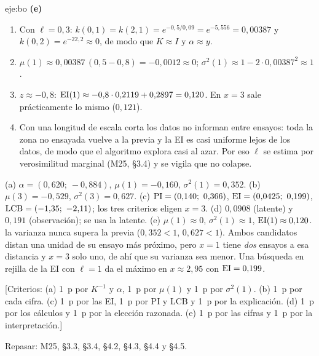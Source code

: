 \begin{solucion}{eje:bo}
\noindent\textbf{(e)}
\begin{enumerate}[label=\arabic*.]
  \item Con $\ell=0{,}3$: $k(0,1)=k(2,1)=e^{-0{,}5/0{,}09}=e^{-5{,}556}=0{,}00387$ y $k(0,2)=e^{-22{,}2}\approx 0$, de modo que $K\approx I$ y $\alpha\approx y$.
  \item $\mu(1)\approx 0{,}00387\,(0{,}5-0{,}8)=-0{,}0012\approx 0$; $\sigma^{2}(1)\approx 1-2\cdot 0{,}00387^{2}\approx 1$.
  \item $z\approx-0{,}8$: $\mathrm{EI}(1)\approx-0{,}8\cdot 0{,}2119+0{,}2897=0{,}120$. En $x=3$ sale prácticamente lo mismo ($0{,}121$).
  \item Con una longitud de escala corta los datos no informan entre ensayos: toda la zona no ensayada vuelve a la previa y la EI es casi uniforme lejos de los datos, de modo que el algoritmo explora casi al azar. Por eso $\ell$ se estima por verosimilitud marginal (M25, §3.4) y se vigila que no colapse.
\end{enumerate}
\resultado (a) $\alpha=(0{,}620;\ -0{,}884)$, $\mu(1)=-0{,}160$, $\sigma^{2}(1)=0{,}352$. (b) $\mu(3)=-0{,}529$, $\sigma^{2}(3)=0{,}627$. (c) $\mathrm{PI}=(0{,}140;\ 0{,}366)$, $\mathrm{EI}=(0{,}0425;\ 0{,}199)$, $\mathrm{LCB}=(-1{,}35;\ -2{,}11)$; los tres criterios eligen $x=3$. (d) $0{,}0908$ (latente) y $0{,}191$ (observación); se usa la latente. (e) $\mu(1)\approx 0$, $\sigma^{2}(1)\approx 1$, $\mathrm{EI}(1)\approx 0{,}120$.
\comprobacion la varianza nunca supera la previa ($0{,}352<1$, $0{,}627<1$). Ambos candidatos distan una unidad de su ensayo más próximo, pero $x=1$ tiene \emph{dos} ensayos a esa distancia y $x=3$ solo uno, de ahí que su varianza sea menor. Una búsqueda en rejilla de la EI con $\ell=1$ da el máximo en $x\approx 2{,}95$ con $\mathrm{EI}=0{,}199$.

[Criterios: (a) 1~p por $K^{-1}$ y $\alpha$, 1~p por $\mu(1)$ y 1~p por $\sigma^{2}(1)$. (b) 1~p por cada cifra. (c) 1~p por las EI, 1~p por PI y LCB y 1~p por la explicación. (d) 1~p por los cálculos y 1~p por la elección razonada. (e) 1~p por las cifras y 1~p por la interpretación.]

Repasar: M25, §3.3, §3.4, §4.2, §4.3, §4.4 y §4.5.
\end{solucion}

